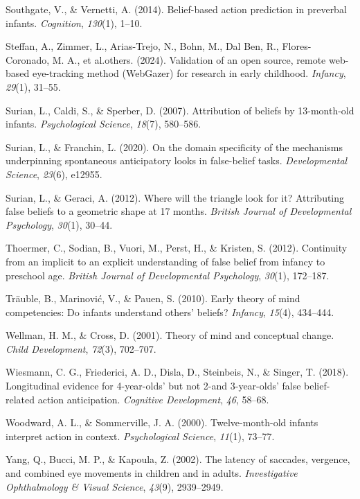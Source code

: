 \documentclass[
  man,floatsintext]{apa6}
\newlength{\cslhangindent}
\newenvironment{CSLReferences}[2] %
 {\begin{list}{}{%
  \setlength{\itemindent}{0pt}
  \setlength{\leftmargin}{0pt}
  \setlength{\parsep}{0pt}
  \ifodd #1
   \setlength{\leftmargin}{\cslhangindent}
   \setlength{\itemindent}{-1\cslhangindent}
  \fi
  \setlength{\itemsep}{#2\baselineskip}}}
 {\end{list}}
\begin{document}
\begin{CSLReferences}{1}{0}
Southgate, V., \& Vernetti, A. (2014). Belief-based action prediction in preverbal infants. \emph{Cognition}, \emph{130}(1), 1--10.

Steffan, A., Zimmer, L., Arias-Trejo, N., Bohn, M., Dal Ben, R., Flores-Coronado, M. A., et al.others. (2024). Validation of an open source, remote web-based eye-tracking method (WebGazer) for research in early childhood. \emph{Infancy}, \emph{29}(1), 31--55.

Surian, L., Caldi, S., \& Sperber, D. (2007). Attribution of beliefs by 13-month-old infants. \emph{Psychological Science}, \emph{18}(7), 580--586.

Surian, L., \& Franchin, L. (2020). On the domain specificity of the mechanisms underpinning spontaneous anticipatory looks in false-belief tasks. \emph{Developmental Science}, \emph{23}(6), e12955.

Surian, L., \& Geraci, A. (2012). Where will the triangle look for it? Attributing false beliefs to a geometric shape at 17 months. \emph{British Journal of Developmental Psychology}, \emph{30}(1), 30--44.

Thoermer, C., Sodian, B., Vuori, M., Perst, H., \& Kristen, S. (2012). Continuity from an implicit to an explicit understanding of false belief from infancy to preschool age. \emph{British Journal of Developmental Psychology}, \emph{30}(1), 172--187.

Träuble, B., Marinović, V., \& Pauen, S. (2010). Early theory of mind competencies: Do infants understand others' beliefs? \emph{Infancy}, \emph{15}(4), 434--444.

Wellman, H. M., \& Cross, D. (2001). Theory of mind and conceptual change. \emph{Child Development}, \emph{72}(3), 702--707.

Wiesmann, C. G., Friederici, A. D., Disla, D., Steinbeis, N., \& Singer, T. (2018). Longitudinal evidence for 4-year-olds' but not 2-and 3-year-olds' false belief-related action anticipation. \emph{Cognitive Development}, \emph{46}, 58--68.

Woodward, A. L., \& Sommerville, J. A. (2000). Twelve-month-old infants interpret action in context. \emph{Psychological Science}, \emph{11}(1), 73--77.

Yang, Q., Bucci, M. P., \& Kapoula, Z. (2002). The latency of saccades, vergence, and combined eye movements in children and in adults. \emph{Investigative Ophthalmology \& Visual Science}, \emph{43}(9), 2939--2949.

\end{CSLReferences}

\endgroup
\end{document}
